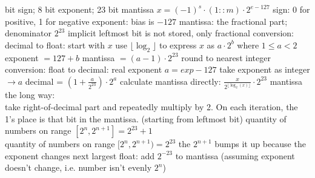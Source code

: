 \documentclass[12pt]{article}
\begin{document}
\begin{spacing}{0.8}
\begin{multicols*}{2}
\begin{flushleft}
\begin{outline}[longenum]
   bit sign; 8 bit exponent; 23 bit mantissa
    \2 $x = (-1)^s \cdot (1::m) \cdot 2^{e-127}$
  \1 sign: 0 for positive, 1 for negative
  \1 exponent: bias is $-127$
  \1 mantissa: the fractional part; denominator $2^{23}$
    \2 implicit leftmost bit is not stored, only fractional
  \1 conversion: decimal to float:
    \2 start with $x$
    \2 use $\lfloor \log_2 \rfloor$ to express $x$ as $a \cdot 2^b$ where $1\leq a < 2$
    \2 exponent $=127+b$
    \2 mantissa $=(a-1) \cdot 2^{23}$
      \3 round to nearest integer
  \1 conversion: float to decimal:
    \2 real exponent $a = exp-127$
    \2 take exponent as integer $\rightarrow a$
    \2 decimal = $(1 + \frac{a}{2^{23}}) \cdot 2^a$
  \1 calculate mantissa directly: $\frac{x}{2^{\lfloor \log_2(x) \rfloor}} \cdot 2^{23}$
  \1 mantissa the long way:
    \\ take right-of-decimal part and repeatedly multiply by 2. On each iteration, the 1's place is that bit in the mantissa. (starting from leftmost bit)
  \1 quantity of numbers on range $[2^n, 2^{n+1}] = 2^{23} + 1$
    \\ quantity of numbers on range $[2^n, 2^{n+1}) = 2^{23}$
    \2 the $2^{n+1}$ bumps it up because the exponent changes
  \1 next largest float: add $2^{-23}$ to mantissa (assuming exponent doesn't change, i.e. number isn't evenly $2^n$)


\end{outline}
\end{flushleft}
\end{multicols*}
\end{spacing}
\end{document}
